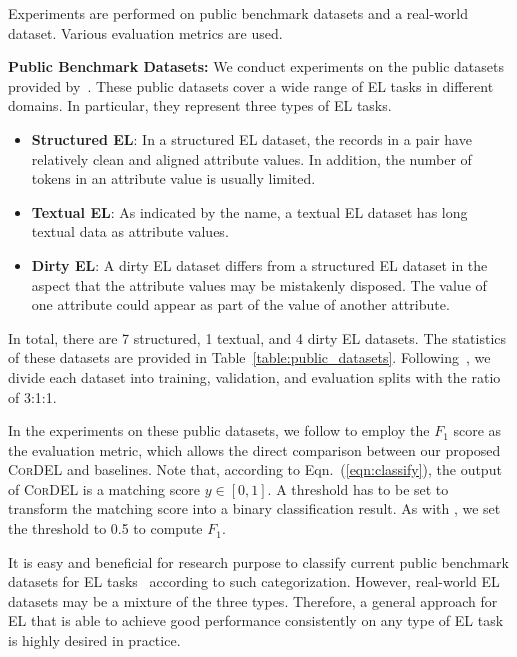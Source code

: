 \documentclass[conference]{IEEEtran}
\begin{document}
Experiments are performed on public benchmark datasets and a real-world dataset. Various evaluation metrics are used.

\textbf{Public Benchmark Datasets:} We conduct experiments on the public datasets provided by~\cite{mudgal2018deep}. These public datasets cover a wide range of EL tasks in different domains. In particular, they represent three types of EL tasks.
\begin{itemize}
    \item \textbf{Structured EL}: In a structured EL dataset, the records in a pair have relatively clean and aligned attribute values. In addition, the number of tokens in an attribute value is usually limited.
    
    \item \textbf{Textual EL}: As indicated by the name, a textual EL dataset has long textual data as attribute values.
    
    \item \textbf{Dirty EL}: A dirty EL dataset differs from a structured EL dataset in the aspect that the attribute values may be mistakenly disposed. The value of one attribute could appear as part of the value of another attribute.
\end{itemize}

In total, there are 7 structured, 1 textual, and 4 dirty EL datasets. The statistics of these datasets are provided in Table~\ref{table:public_datasets}. Following~\cite{mudgal2018deep}, we divide each dataset into training, validation, and evaluation splits with the ratio of 3:1:1.

In the experiments on these public datasets, we follow \cite{mudgal2018deep} to employ the $F_1$ score as the evaluation metric, which allows the direct comparison between our proposed \textsc{CorDEL} and baselines. Note that, according to Eqn.~(\ref{eqn:classify}), the output of \textsc{CorDEL} is a matching score $y \in [0,1]$. A threshold has to be set to transform the matching score into a binary classification result. As with \cite{mudgal2018deep}, we set the threshold to 0.5 to compute $F_1$.

It is easy and beneficial for research purpose to classify current public benchmark datasets for EL tasks~\cite{mudgal2018deep} according to such categorization. However, real-world EL datasets may be a mixture of the three types. Therefore, a general approach for EL that is able to achieve good performance consistently on any type of EL task is highly desired in practice.
\end{document}
